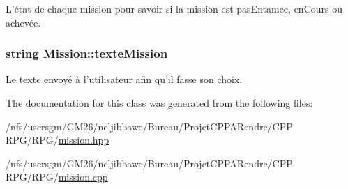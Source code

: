 L'état de chaque mission pour savoir si la mission est pas\-Entamee, en\-Cours ou achevée. 

\hypertarget{class_mission_ac289a213c14ea87ba5740be349c23419}{
\subsubsection[{texte\-Mission}]{\setlength{\rightskip}{0pt plus 5cm}string Mission\-::texte\-Mission\hspace{0.3cm}{\ttfamily [protected]}}}\label{class_mission_ac289a213c14ea87ba5740be349c23419}


Le texte envoyé à l'utilisateur afin qu'il fasse son choix. 



The documentation for this class was generated from the following files\-:\begin{DoxyCompactItemize}
\item 
/nfs/usersgm/\-G\-M26/neljibbawe/\-Bureau/\-Projet\-C\-P\-P\-A\-Rendre/\-C\-P\-P R\-P\-G/\-R\-P\-G/\hyperlink{mission_8hpp}{mission.\-hpp}\item 
/nfs/usersgm/\-G\-M26/neljibbawe/\-Bureau/\-Projet\-C\-P\-P\-A\-Rendre/\-C\-P\-P R\-P\-G/\-R\-P\-G/\hyperlink{mission_8cpp}{mission.\-cpp}\end{DoxyCompactItemize}
